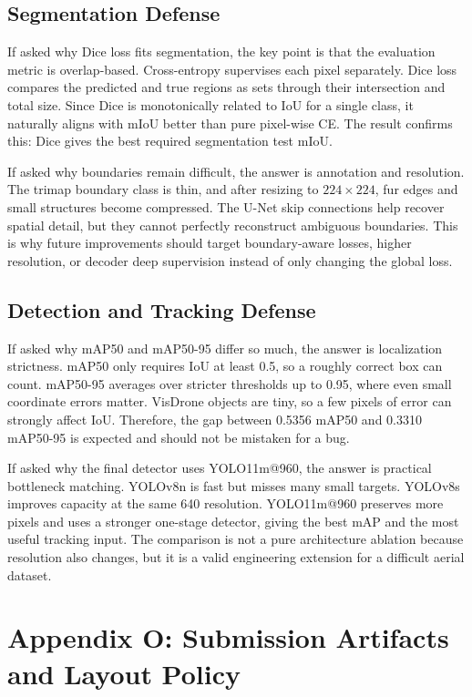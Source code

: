\documentclass[10pt,twocolumn]{article}
\begin{document}
\subsection{Segmentation Defense}

If asked why Dice loss fits segmentation, the key point is that the evaluation metric is overlap-based. Cross-entropy supervises each pixel separately. Dice loss compares the predicted and true regions as sets through their intersection and total size. Since Dice is monotonically related to IoU for a single class, it naturally aligns with mIoU better than pure pixel-wise CE. The result confirms this: Dice gives the best required segmentation test mIoU.

If asked why boundaries remain difficult, the answer is annotation and resolution. The trimap boundary class is thin, and after resizing to $224\times224$, fur edges and small structures become compressed. The U-Net skip connections help recover spatial detail, but they cannot perfectly reconstruct ambiguous boundaries. This is why future improvements should target boundary-aware losses, higher resolution, or decoder deep supervision instead of only changing the global loss.

\subsection{Detection and Tracking Defense}

If asked why mAP50 and mAP50-95 differ so much, the answer is localization strictness. mAP50 only requires IoU at least 0.5, so a roughly correct box can count. mAP50-95 averages over stricter thresholds up to 0.95, where even small coordinate errors matter. VisDrone objects are tiny, so a few pixels of error can strongly affect IoU. Therefore, the gap between 0.5356 mAP50 and 0.3310 mAP50-95 is expected and should not be mistaken for a bug.

If asked why the final detector uses YOLO11m@960, the answer is practical bottleneck matching. YOLOv8n is fast but misses many small targets. YOLOv8s improves capacity at the same 640 resolution. YOLO11m@960 preserves more pixels and uses a stronger one-stage detector, giving the best mAP and the most useful tracking input. The comparison is not a pure architecture ablation because resolution also changes, but it is a valid engineering extension for a difficult aerial dataset.

\section{Appendix O: Submission Artifacts and Layout Policy}
\end{document}
